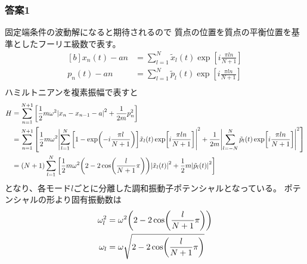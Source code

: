 \documentclass[../../sp_2015.tex]{subfiles}
\begin{document}
\subsubsection*{答案1}
固定端条件の波動解になると期待されるので
質点の位置を質点の平衡位置を基準としたフーリエ級数で表す。
\begin{equation}\begin{aligned}[b]
    x_n(t)-an &= \sum_{l=1}^{N} \tilde{x}_l(t)\exp[i\frac{\pi ln}{N+1}]\\
    p_n(t)-an &= \sum_{l=1}^{N} \tilde{p}_l(t)\exp[i\frac{\pi ln}{N+1}]\\
\end{aligned}\end{equation}
ハミルトニアンを複素振幅で表すと
\begin{equation}\begin{aligned}[b]
    H &= \sum_{n=1}^{N+1}\qty[\frac{1}{2}m\omega^2\abs{x_n-x_{n-1}-a}^2+\frac{1}{2m}p_n^2]\\
    &= \sum_{n=1}^{N+1}\qty[\frac{1}{2}m\omega^2\abs{\sum_{l=1}^{N}\qty[1-\exp(-i\frac{\pi l}{N+1})]\tilde{x}_l(t)\exp[i\frac{\pi ln}{N+1}]}^2
    +\frac{1}{2m}\abs{\sum_{l=-N}^{N}\tilde{p}_l(t)\exp[i\frac{\pi ln}{N+1}]}^2]\\
    &= (N+1)\sum_{l=1}^{N}\qty[\frac{1}{2}m\omega^2\qty(2-2\cos(\frac{l}{N+1}\pi))\abs{\tilde{x}_l(t)}^2
    +\frac{1}{2}m\abs{\tilde{p}_l(t)}^2]
\end{aligned}\end{equation}
となり、各モード\(l\)ごとに分離した調和振動子ポテンシャルとなっている。
ポテンシャルの形より固有振動数は
\begin{equation}\begin{aligned}[b]
    \omega_l^2 &= \omega^2\qty(2-2\cos(\frac{l}{N+1}\pi))\\
    \omega_l &= \omega\sqrt{2-2\cos(\frac{l}{N+1}\pi)}
\end{aligned}\end{equation}
\end{document}

